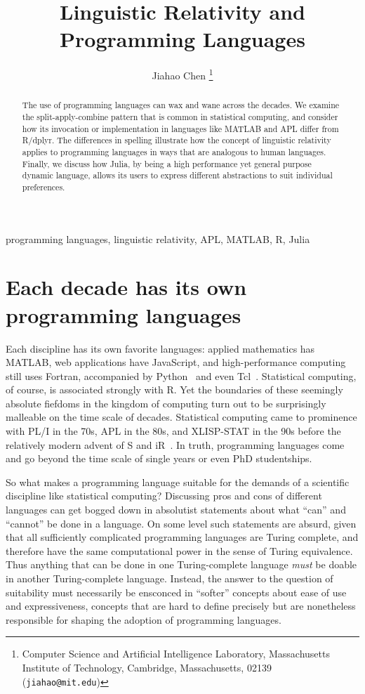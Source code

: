 \documentclass[11pt]{asaproc}
\title{Linguistic Relativity and Programming Languages}
\author{
    Jiahao Chen
    \thanks{Computer Science and Artificial Intelligence Laboratory,
               Massachusetts Institute of Technology,
               Cambridge, Massachusetts, 02139 ({\tt jiahao@mit.edu})}
}
\begin{document}
\maketitle

\begin{abstract}
The use of programming languages can wax and wane across the decades. We
examine the split-apply-combine pattern that is common in statistical
computing, and consider how its invocation or implementation in languages like
MATLAB and APL differ from R/dplyr. The differences in spelling illustrate how
the concept of linguistic relativity applies to programming languages in ways
that are analogous to human languages. Finally, we discuss how Julia, by being
a high performance yet general purpose dynamic language, allows its users to
express different abstractions to suit individual preferences.
\end{abstract}

\begin{keywords}
programming languages, linguistic relativity, APL, MATLAB, R, Julia
\end{keywords}

\section{Each decade has its own programming languages}

Each discipline has its own favorite languages: applied mathematics has MATLAB,
web applications have JavaScript, and high-performance computing still uses
Fortran, accompanied by Python~\citep{scipy} and even Tcl~\citep{Phillips2014}.
Statistical computing, of course, is associated strongly with R. Yet the
boundaries of these seemingly absolute fiefdoms in the kingdom of computing
turn out to be surprisingly malleable on the time scale of decades. Statistical
computing came to prominence with PL/I in the 70s, APL in the 80s, and
XLISP-STAT in the 90s before the relatively modern advent of S and
iR~\citep{deLeeuw2005}. In truth, programming languages come and go beyond the
time scale of single years or even PhD studentships.

So what makes a programming language suitable for the demands of a scientific
discipline like statistical computing?  Discussing pros and cons of different
languages can get bogged down in absolutist statements about what ``can'' and
``cannot'' be done in a language. On some level such statements are absurd,
given that all sufficiently complicated programming languages are Turing
complete, and therefore have the same computational power in the sense of
Turing equivalence. Thus anything that can be done in one Turing-complete
language \textit{must} be doable in another Turing-complete language. Instead,
the answer to the question of suitability must necessarily be ensconced in
``softer'' concepts about ease of use and expressiveness, concepts that are
hard to define precisely but are nonetheless responsible for shaping the
adoption of programming languages.
\end{document}
